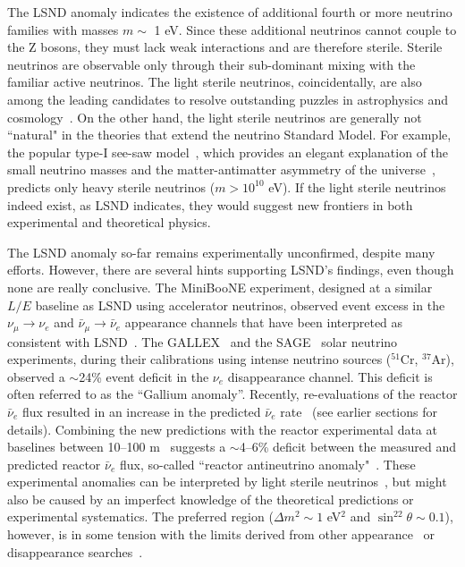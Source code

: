 \documentclass[aps,twocolumn,preprintnumbers,amsmath,superscriptaddress,amssymb,floats,nofootinbib]{revtex4-1}
\begin{document}
The LSND anomaly indicates the existence of additional fourth or more neutrino families with masses $m \sim$ 1 eV. 
Since these additional neutrinos cannot couple to the Z bosons, they must lack weak interactions and are therefore sterile. 
Sterile neutrinos are observable only through their sub-dominant mixing with the familiar active neutrinos. 
The light sterile neutrinos, coincidentally, are also among the leading candidates to resolve outstanding puzzles in astrophysics and 
cosmology~\cite{Dodelson,Kusenko,Wyman,Battye}.
On the other hand, the light sterile neutrinos are generally not ``natural" in the theories that extend the neutrino Standard Model. 
For example, the popular type-I see-saw model~\cite{Minkowski,Yanagida,GellMann,Mohapatra}, 
which provides an elegant explanation of the small neutrino masses and the matter-antimatter asymmetry of the universe~\cite{Fukugita}, predicts only heavy sterile neutrinos ($m >10^{10}$ eV).
If the light sterile neutrinos indeed exist, as LSND indicates, they would suggest new frontiers in both experimental and theoretical physics.

The LSND anomaly so-far remains experimentally unconfirmed, despite many efforts. 
However, there are several hints supporting LSND's findings, even though none are really conclusive.
The MiniBooNE experiment, designed at a similar $L/E$ baseline as LSND using accelerator neutrinos, observed event excess 
in the $\nu_{\mu}\rightarrow\nu_e$ and $\bar\nu_{\mu}\rightarrow\bar\nu_e$ appearance channels that have been interpreted as consistent with LSND~\cite{MiniBooNE2007,MiniBooNE2013}.
The GALLEX~\cite{GALLEX2010} and the SAGE~\cite{SAGE2009} solar neutrino experiments, during their calibrations using intense neutrino sources ($^{51}$Cr, $^{37}$Ar), observed a $\sim$24\% event deficit in the $\nu_e$ disappearance channel. 
This deficit is often referred to as the ``Gallium anomaly''. 
Recently, re-evaluations of the reactor $\bar\nu_e$ flux resulted in an increase in the predicted $\bar\nu_e$ rate~\cite{Mueller, Huber} (see earlier sections for details).
Combining the new predictions with the reactor experimental data at baselines between 10--100 m~\cite{ILL,Gosgen,Rovno,Krasnoyarsk,SRP,Bugey4,Bugey3} suggests a $\sim$4--6\% deficit between the measured and predicted reactor $\bar\nu_e$ flux, so-called 
``reactor antineutrino anomaly"~\cite{Mention,Zhang13}. 
These experimental anomalies can be interpreted by light sterile neutrinos~\cite{Guinti2011}, 
but might also be caused by an imperfect knowledge of the theoretical predictions or experimental systematics.  
The preferred region ($\Delta{m}^2\sim1$ eV$^2$ and $\sin^22\theta\sim0.1$), however, is in some tension with the limits derived from other appearance~\cite{KARMEN2002,NOMAD03,OPERA13,ICARUS13} or disappearance searches~\cite{Stockdale84,Dydak84,MiniBooNE12-nubar,MiniBooNE12-nu,SuperK2000,MINOS11-NC,Bugey3,Conrad12,Sousa-Neutrino14,DayaBaySterile}.
\end{document}
